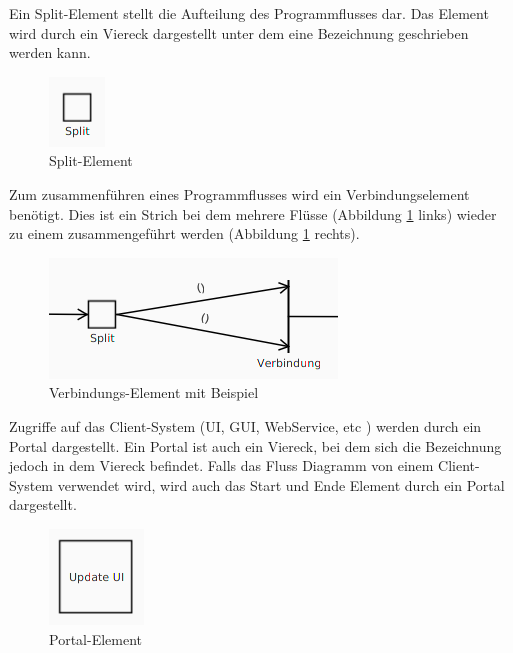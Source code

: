 Ein Split-Element stellt die Aufteilung des Programmflusses dar. Das Element wird durch ein Viereck dargestellt
unter dem eine Bezeichnung geschrieben werden kann.
\begin{figure}[H]
	\centering
	\includegraphics[width=\maxwidth{.9\textwidth}]{Element_Split.png}
	\caption{Split-Element}
\end{figure}

Zum zusammenführen eines Programmflusses wird ein Verbindungselement benötigt. Dies ist ein Strich bei dem
mehrere Flüsse (Abbildung \ref{flowElementVerbindung} links) wieder zu einem zusammengeführt werden (Abbildung
\ref{flowElementVerbindung} rechts).
\begin{figure}[H]
	\centering
	\includegraphics[width=\maxwidth{.9\textwidth}]{Element_Split_Verbindung.png}
	\caption{Verbindungs-Element mit Beispiel}
	\label{flowElementVerbindung}
\end{figure}

\pagebreak
Zugriffe auf das Client-System (UI, GUI, WebService, etc \cite{flowDesign}) werden durch ein Portal dargestellt.
Ein Portal ist auch ein Viereck, bei dem sich die Bezeichnung jedoch in dem Viereck befindet. Falls das Fluss Diagramm
von einem Client-System verwendet wird, wird auch das Start und Ende Element durch ein Portal dargestellt.
\begin{figure}[H]
	\centering
	\includegraphics[width=\maxwidth{.9\textwidth}]{Element_Portal.png}
	\caption{Portal-Element}
\end{figure}

